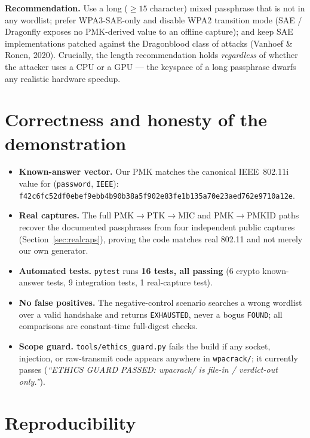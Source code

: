 \documentclass[11pt,a4paper]{article}
\newcommand{\code}[1]{\texttt{#1}}
\begin{document}
\noindent\textbf{Recommendation.} Use a long ($\geq 15$ character) mixed passphrase that is not
in any wordlist; prefer WPA3-SAE-only and disable WPA2 transition mode (SAE / Dragonfly exposes
no PMK-derived value to an offline capture); and keep SAE implementations patched against the
Dragonblood class of attacks (Vanhoef \& Ronen, 2020). Crucially, the length recommendation
holds \emph{regardless} of whether the attacker uses a CPU or a GPU --- the keyspace of a long
passphrase dwarfs any realistic hardware speedup.

\section{Correctness and honesty of the demonstration}

\begin{itemize}
\item \textbf{Known-answer vector.} Our PMK matches the canonical IEEE~802.11i value for
      (\code{password}, \code{IEEE}):
      \code{f42c6fc52df0ebef9ebb4b90b38a5f902e83fe1b135a70e23aed762e9710a12e}.
\item \textbf{Real captures.} The full PMK$\to$PTK$\to$MIC and PMK$\to$PMKID paths recover the
      documented passphrases from four independent public captures (Section~\ref{sec:realcaps}),
      proving the code matches real 802.11 and not merely our own generator.
\item \textbf{Automated tests.} \code{pytest} runs \textbf{16 tests, all passing} (6 crypto
      known-answer tests, 9 integration tests, 1 real-capture test).
\item \textbf{No false positives.} The negative-control scenario searches a wrong wordlist over
      a valid handshake and returns \code{EXHAUSTED}, never a bogus \code{FOUND}; all comparisons
      are constant-time full-digest checks.
\item \textbf{Scope guard.} \code{tools/ethics\_guard.py} fails the build if any socket,
      injection, or raw-transmit code appears anywhere in \code{wpacrack/}; it currently passes
      (\emph{``ETHICS GUARD PASSED: wpacrack/ is file-in / verdict-out only.''}).
\end{itemize}

\section{Reproducibility}
\label{sec:repro}
\end{document}
